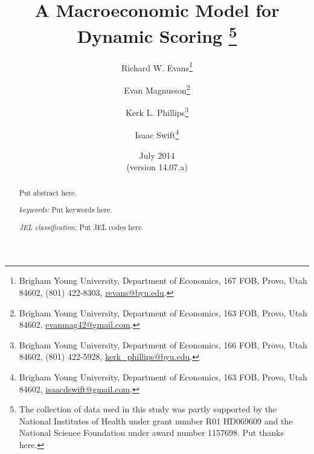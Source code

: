 \documentclass[letterpaper,12pt]{article}
\theoremstyle{definition}
\begin{document}
\begin{titlepage}
\title{A Macroeconomic Model for Dynamic Scoring
       \thanks{The collection of data used in this study was partly supported by the National Institutes of Health under grant number R01 HD069609 and the National Science Foundation under award number 1157698.
       Put thanks here.}
       }
\author{
  Richard W. Evans\footnote{Brigham Young University, Department of Economics, 167 FOB, Provo, Utah 84602, (801) 422-8303, \href{mailto:revans@byu.edu}{revans@byu.edu}.} \\[-2pt]
  \and
  Evan Magnusson\footnote{Brigham Young University, Department of Economics, 163 FOB, Provo, Utah 84602, \href{mailto:evanmag42@gmail.com}{evanmag42@gmail.com}.} \\[-2pt]
  \and
  Kerk L. Phillips\footnote{Brigham Young University, Department of Economics, 166 FOB, Provo, Utah 84602, (801) 422-5928, \href{mailto:kerk_phillips@byu.edu}{kerk\_phillips@byu.edu}.} \\[-2pt]
  \and
  Isaac Swift\footnote{Brigham Young University, Department of Economics, 163 FOB, Provo, Utah 84602, \href{mailto:isaacdswift@gmail.com}{isaacdswift@gmail.com}.} \\[-2pt]}
\date{July 2014 \\
  \scriptsize{(version 14.07.a)}}
\maketitle
\begin{abstract}
\normalsize{Put abstract here.

\vspace{3mm}

\noindent\textit{keywords:}\: Put keywords here.

\vspace{3mm}

\noindent\textit{JEL classification:} Put JEL codes here.}
\end{abstract}
\thispagestyle{empty}
\end{titlepage}
\end{document}
